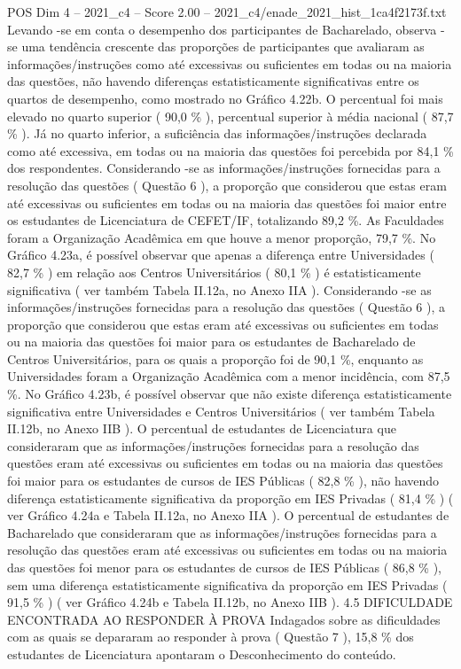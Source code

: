 \begin{textsample}{POS Dim 4 – 2021\_c4 – Score 2.00 – 2021\_c4/enade\_2021\_hist\_1ca4f2173f.txt}
Levando -se em conta o desempenho dos participantes de Bacharelado, observa -se uma tendência crescente das proporções de participantes que avaliaram as informações/instruções como até excessivas ou suficientes em todas ou na maioria das questões, não havendo diferenças estatisticamente significativas entre os quartos de desempenho, como mostrado no Gráfico 4.22b.
O percentual foi mais elevado no quarto superior ( 90,0 \% ), percentual superior à média nacional ( 87,7 \% ).
Já no quarto inferior, a suficiência das informações/instruções declarada como até excessiva, em todas ou na maioria das questões foi percebida por 84,1 \% dos respondentes.
Considerando -se as informações/instruções fornecidas para a resolução das questões ( Questão 6 ), a proporção que considerou que estas eram até excessivas ou suficientes em todas ou na maioria das questões foi maior entre os estudantes de Licenciatura de CEFET/IF, totalizando 89,2 \%.
As Faculdades foram a Organização Acadêmica em que houve a menor proporção, 79,7 \%.
No Gráfico 4.23a, é possível observar que apenas a diferença entre Universidades ( 82,7 \% ) em relação aos Centros Universitários ( 80,1 \% ) é estatisticamente significativa ( ver também Tabela II.12a, no Anexo IIA ).
Considerando -se as informações/instruções fornecidas para a resolução das questões ( Questão 6 ), a proporção que considerou que estas eram até excessivas ou suficientes em todas ou na maioria das questões foi maior para os estudantes de Bacharelado de Centros Universitários, para os quais a proporção foi de 90,1 \%, enquanto as Universidades foram a Organização Acadêmica com a menor incidência, com 87,5 \%.
No Gráfico 4.23b, é possível observar que não existe diferença estatisticamente significativa entre Universidades e Centros Universitários ( ver também Tabela II.12b, no Anexo IIB ).
O percentual de estudantes de Licenciatura que consideraram que as informações/instruções fornecidas para a resolução das questões eram até excessivas ou suficientes em todas ou na maioria das questões foi maior para os estudantes de cursos de IES Públicas ( 82,8 \% ), não havendo diferença estatisticamente significativa da proporção em IES Privadas ( 81,4 \% ) ( ver Gráfico 4.24a e Tabela II.12a, no Anexo IIA ).
O percentual de estudantes de Bacharelado que consideraram que as informações/instruções fornecidas para a resolução das questões eram até excessivas ou suficientes em todas ou na maioria das questões foi menor para os estudantes de cursos de IES Públicas ( 86,8 \% ), sem uma diferença estatisticamente significativa da proporção em IES Privadas ( 91,5 \% ) ( ver Gráfico 4.24b e Tabela II.12b, no Anexo IIB ). 4.5 DIFICULDADE ENCONTRADA AO RESPONDER À PROVA Indagados sobre as dificuldades com as quais se depararam ao responder à prova ( Questão 7 ), 15,8 \% dos estudantes de Licenciatura apontaram o Desconhecimento do conteúdo.

\end{textsample}
